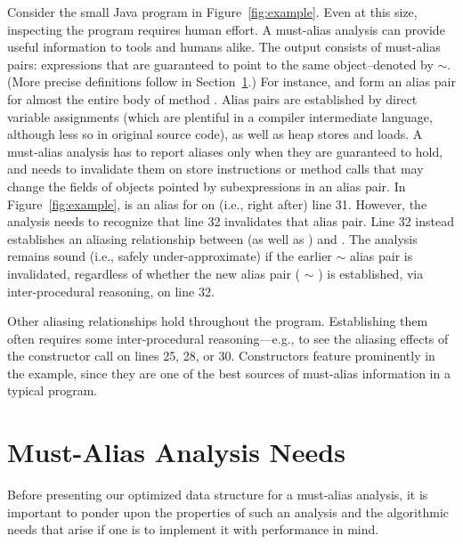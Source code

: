 Consider the small Java program in Figure~\ref{fig:example}. Even at this size,
inspecting the program requires human effort. A must-alias analysis can provide
useful information to tools and humans alike. The output consists of must-alias
pairs: expressions that are guaranteed to point to the same object--denoted by
$\sim$. (More precise definitions follow in Section~\ref{sec:needs}.) For
instance,  and  form an alias pair for almost the entire
body of method .  Alias pairs are established by direct variable
assignments (which are plentiful in a compiler intermediate language, although
less so in original source code), as well as heap stores and loads. A
must-alias analysis has to report aliases only when they are guaranteed to
hold, and needs to invalidate them on store instructions or method calls that
may change the fields of objects pointed by subexpressions in an alias pair. In
Figure~\ref{fig:example},  is an alias for  on (i.e.,
right after) line 31. However, the analysis needs to recognize that line 32
invalidates that alias pair. Line 32 instead establishes an aliasing
relationship between  (as well as )
and . The analysis remains sound (i.e., safely under-approximate) if the
earlier  $\sim$  alias pair is invalidated, regardless
of whether the new alias pair ( $\sim$ ) is
established, via inter-procedural reasoning, on line 32. 

Other aliasing relationships hold throughout the program. Establishing them
often requires some inter-procedural reasoning---e.g., to see the aliasing
effects of the constructor call on lines 25, 28, or 30. Constructors feature
prominently in the example, since they are one of the best sources of
must-alias information in a typical program.


\section{Must-Alias Analysis Needs}
\label{sec:needs}

Before presenting our optimized data structure for a must-alias analysis, it is
important to ponder upon the properties of such an analysis and the algorithmic
needs that arise if one is to implement it with performance in mind.

